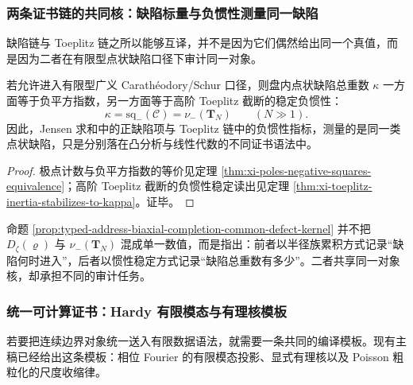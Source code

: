 \subsubsection{两条证书链的共同核：缺陷标量与负惯性测量同一缺陷}\label{subsubsec:typed-address-biaxial-completion-common-defect-kernel}
缺陷链与 Toeplitz 链之所以能够互译，并不是因为它们偶然给出同一个真值，而是因为二者在有限型点状缺陷口径下审计同一对象。

\begin{proposition}[有限型点状缺陷的共同核]\label{prop:typed-address-biaxial-completion-common-defect-kernel}
若允许进入有限型广义 Carath\'eodory/Schur 口径，则盘内点状缺陷总重数 \(\kappa\) 一方面等于负平方指数，另一方面等于高阶 Toeplitz 截断的稳定负惯性：
\[
\kappa
=
\mathrm{sq}_{-}(\mathscr{C})
=
\nu_{-}(\mathbf{T}_N)
\qquad (N\gg 1).
\]
因此，Jensen 求和中的正缺陷项与 Toeplitz 链中的负惯性指标，测量的是同一类点状缺陷，只是分别落在凸分析与线性代数的不同证书语法中。
\end{proposition}
\begin{proof}
极点计数与负平方指数的等价见定理 \ref{thm:xi-poles-negative-squares-equivalence}；高阶 Toeplitz 截断的负惯性稳定读出见定理 \ref{thm:xi-toeplitz-inertia-stabilizes-to-kappa}。证毕。
\end{proof}

命题 \ref{prop:typed-address-biaxial-completion-common-defect-kernel} 并不把 \(D_{\zeta}(\varrho)\) 与 \(\nu_-(\mathbf{T}_N)\) 混成单一数值，而是指出：前者以半径族累积方式记录“缺陷何时进入”，后者以惯性稳定方式记录“缺陷总重数有多少”。二者共享同一对象核，却承担不同的审计任务。

\subsubsection{统一可计算证书：Hardy 有限模态与有理核模板}\label{subsubsec:typed-address-biaxial-completion-computable-certificate-template}
若要把连续边界对象统一送入有限数据语法，就需要一条共同的编译模板。现有主稿已经给出这条模板：相位 Fourier 的有限模态投影、显式有理核以及 Poisson 粗粒化的尺度收缩律。

